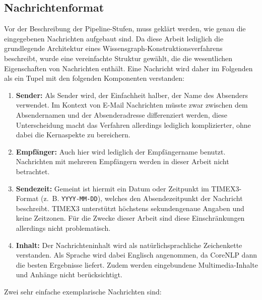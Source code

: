 \subsection{Nachrichtenformat}%
\label{sec:text2kg:nlp:msg}

Vor der Beschreibung der Pipeline-Stufen, muss geklärt werden, wie genau die eingegebenen Nachrichten aufgebaut sind.
Da diese Arbeit lediglich die grundlegende Architektur eines Wissensgraph-Konstruktionsverfahrens beschreibt, wurde eine vereinfachte Struktur gewählt, die die wesentlichen Eigenschaften von Nachrichten enthält.
Eine Nachricht wird daher im Folgenden als ein Tupel mit den folgenden Komponenten verstanden:
\begin{enumerate}
	\item \textbf{Sender:}
		Als Sender wird, der Einfachheit halber, der Name des Absenders verwendet.
		Im Kontext von E-Mail Nachrichten müsste zwar zwischen dem Absendernamen und der Absenderadresse differenziert werden, diese Unterscheidung macht das Verfahren allerdings lediglich komplizierter, ohne dabei die Kernaspekte zu bereichern.
	\item \textbf{Empfänger:}
		Auch hier wird lediglich der Empfängername benutzt.
		Nachrichten mit mehreren Empfängern werden in dieser Arbeit nicht betrachtet.
	\item \textbf{Sendezeit:}
		Gemeint ist hiermit ein Datum oder Zeitpunkt im TIMEX3-Format (z.~B. \texttt{YYYY-MM-DD}), welches den Absendezeitpunkt der Nachricht beschreibt.
		TIMEX3 unterstützt höchstens sekundengenaue Angaben und keine Zeitzonen.
		Für die Zwecke dieser Arbeit sind diese Einschränkungen allerdings nicht problematisch.
	\item \textbf{Inhalt:}
		Der Nachrichteninhalt wird als natürlichsprachliche Zeichenkette verstanden.
		Als Sprache wird dabei Englisch angenommen, da CoreNLP dann die besten Ergebnisse liefert.
		Zudem werden eingebundene Multimedia-Inhalte und Anhänge nicht berücksichtigt.
\end{enumerate}

Zwei sehr einfache exemplarische Nachrichten sind:
\begin{center}\end{center}

